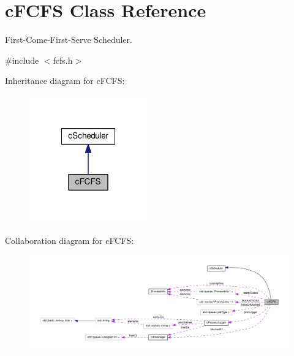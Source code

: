 \hypertarget{classcFCFS}{\section{c\-F\-C\-F\-S \-Class \-Reference}
\label{d6/dc3/classcFCFS}
}


\-First-\/\-Come-\/\-First-\/\-Serve \-Scheduler.  




{\ttfamily \#include $<$fcfs.\-h$>$}



\-Inheritance diagram for c\-F\-C\-F\-S\-:\nopagebreak
\begin{figure}[H]
\begin{center}
\leavevmode
\includegraphics[width=144pt]{d2/d94/classcFCFS__inherit__graph}
\end{center}
\end{figure}


\-Collaboration diagram for c\-F\-C\-F\-S\-:\nopagebreak
\begin{figure}[H]
\begin{center}
\leavevmode
\includegraphics[width=350pt]{d4/d8d/classcFCFS__coll__graph}
\end{center}
\end{figure}
